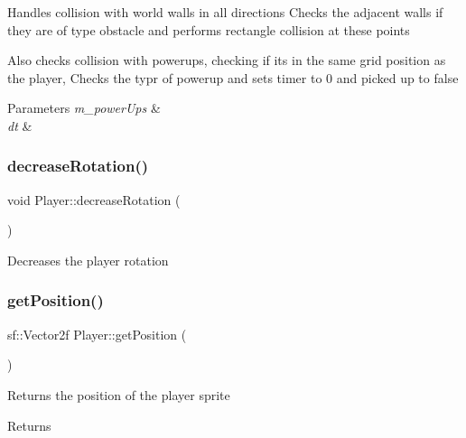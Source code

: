 Handles collision with world walls in all directions Checks the adjacent walls if they are of type obstacle and performs rectangle collision at these points 

Also checks collision with powerups, checking if its in the same grid position as the player, Checks the typr of powerup and sets timer to 0 and picked up to false 


\begin{DoxyParams}{Parameters}
{\em m\+\_\+power\+Ups} & \\
\hline
{\em dt} & \\
\hline
\end{DoxyParams}
\mbox{\label{class_player_ad65092429c9fcb4d15f6af2591726b81}} 
\subsubsection{\texorpdfstring{decreaseRotation()}{decreaseRotation()}}
{\footnotesize\ttfamily void Player\+::decrease\+Rotation (\begin{DoxyParamCaption}{ }\end{DoxyParamCaption})}



Decreases the player rotation 

\mbox{\label{class_player_a23356f99a9de86d3d47eadb679b332dc}} 
\subsubsection{\texorpdfstring{getPosition()}{getPosition()}}
{\footnotesize\ttfamily sf\+::\+Vector2f Player\+::get\+Position (\begin{DoxyParamCaption}{ }\end{DoxyParamCaption})}



Returns the position of the player sprite 

\begin{DoxyReturn}{Returns}

\end{DoxyReturn}
\mbox{\label{class_player_aa2890f51b31e33f439f6bd67092168f7}} 
